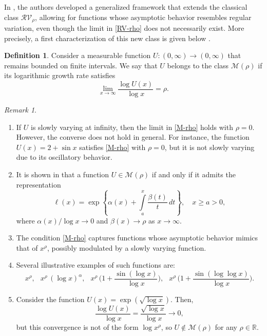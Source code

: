 \documentclass[12pt,reqno]{amsart}
\theoremstyle{plain}
\theoremstyle{definition}
\newtheorem{defi}[thm]{Definition}
\theoremstyle{remark}
\newtheorem{rem}[thm]{Remark}
\numberwithin{equation}{section}
\begin{document}
In \cite{Cadena}, the authors developed a generalized framework that extends the classical class $\mathcal{RV}_\rho$, allowing for functions whose asymptotic behavior resembles regular variation, even though the limit in \eqref{RV-rho} does not necessarily exist. More precisely, a first characterization of this new class is given below \cite[Theorem 1.1, p. 111]{Cadena}.
\begin{defi}
\label{M-rho-def}
    Consider a measurable function $ U \colon (0,\infty) \to (0,\infty) $ that remains bounded on finite intervals. We say that $U$ belongs to the class $ \mathcal{M}(\rho) $ if its logarithmic growth rate satisfies
\begin{equation}
    \label{M-rho}
    \lim_{x \to \infty} \frac{\log U (x)}{\log x} = \rho.
\end{equation}
\end{defi}
\begin{rem}
~\rm
\begin{enumerate}[label=(\roman*)]
    \item If $U$ is slowly varying at infinity, then the limit in \eqref{M-rho} holds with $ \rho = 0 $. However, the converse does not hold in general. For instance, the function $ U(x) = 2 + \sin x $ satisfies \eqref{M-rho} with $ \rho = 0 $, but it is not slowly varying due to its oscillatory behavior.
    \item It is shown in \cite[Theorem 1.2, p.~111]{Cadena} that a function $U\in \mathcal{M}(\rho) $ if and only if it admits the representation
    \begin{equation}
        \label{M-rho-Chara}
        \ell (x) = \exp \left\{ 
        \alpha(x) + \int\limits_a^x \frac{\beta(t)}{t} \, dt 
        \right\}, \quad x \geq a > 0,
    \end{equation}
    where $ \alpha(x)/\log x \to 0 $ and $ \beta(x) \to \rho $ as $ x \to \infty $.
    \item The condition \eqref{M-rho} captures functions whose asymptotic behavior mimics that of $ x^\rho $, possibly modulated by a slowly varying function.
    \item Several illustrative examples of such functions are: 
\begin{equation}\label{M-examples}
 x^{\rho},\;\,\;  x^{\rho}\, (\log x)^{\alpha},\;\,\; x^{\rho}\, \Biggl( 1 + \frac{\sin(\log x)}{\log x} \Biggr), \;\,\; x^{\rho}\,\Biggl( 1 + \frac{\sin(\log \log x)}{\log x} \Biggr).
\end{equation}
\item  Consider the function $U(x) = \exp(\sqrt{\log x}).$
Then,
$$
\frac{\log U (x)}{\log x} = \frac{\sqrt{\log x}}{\log x} \to 0,
$$
but this convergence is not of the form $ \log x^\rho $, so $U  \notin \mathcal{M}(\rho) $ for any $ \rho \in \mathbb{R} $.
\end{enumerate}
\end{rem}
\end{document}
